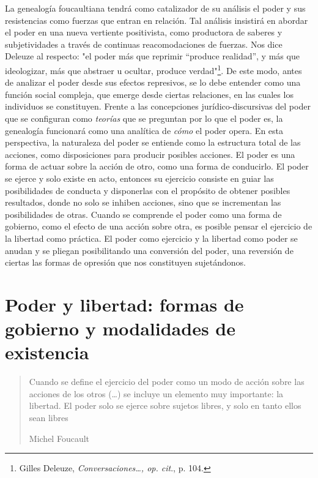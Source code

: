 La genealogía foucaultiana tendrá como catalizador de su análisis el
poder y sus resistencias como fuerzas que entran en relación. Tal
análisis insistirá en abordar el poder en una nueva vertiente
positivista, como productora de saberes y subjetividades a través de
continuas reacomodaciones de fuerzas. Nos dice Deleuze al respecto: "el
poder más que reprimir ``produce realidad'', y más que ideologizar, más
que abstraer u ocultar, produce verdad"\footnote{Gilles Deleuze,
  \emph{Conversaciones\ldots, op. cit}., p. 104.}. De este modo, antes
de analizar el poder desde sus efectos represivos, se lo debe entender
como una función social compleja, que emerge desde ciertas relaciones,
en las cuales los individuos se constituyen. Frente a las concepciones
jurídico-discursivas del poder que se configuran como \emph{teorías} que
se preguntan por lo que el poder es, la genealogía funcionará como una
analítica de \emph{cómo} el poder opera. En esta perspectiva, la
naturaleza del poder se entiende como la estructura total de las
acciones, como disposiciones para producir posibles acciones. El poder
es una forma de actuar sobre la acción de otro, como una forma de
conducirlo. El poder se ejerce y solo existe en acto, entonces su
ejercicio consiste en guiar las posibilidades de conducta y disponerlas
con el propósito de obtener posibles resultados, donde no solo se
inhiben acciones, sino que se incrementan las posibilidades de otras.
Cuando se comprende el poder como una forma de gobierno, como el efecto
de una acción sobre otra, es posible pensar el ejercicio de la libertad
como práctica. El poder como ejercicio y la libertad como poder se
anudan y se pliegan posibilitando una conversión del poder, una
reversión de ciertas las formas de opresión que nos constituyen
sujetándonos.

\section{Poder y libertad: formas de gobierno y modalidades de existencia}

\begin{quote}
Cuando se define el ejercicio del poder como un modo de acción sobre las
acciones de los otros (\dots) se incluye un elemento muy
importante: la libertad. El poder solo se ejerce sobre sujetos libres, y
solo en tanto ellos sean libres

Michel Foucault
\end{quote}

